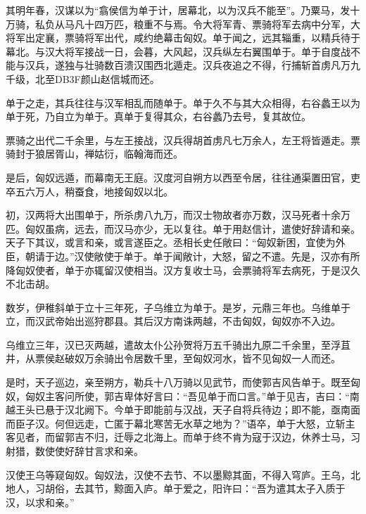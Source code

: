 \documentclass[12pt,UTF8]{ctexbook}
\begin{document}
其明年春，汉谋以为“翕侯信为单于计，居幕北，以为汉兵不能至”。乃粟马，发十万骑，私负从马凡十四万匹，粮重不与焉。令大将军青、票骑将军去病中分军，大将军出定襄，票骑将军出代，咸约绝幕击匈奴。单于闻之，远其辎重，以精兵待于幕北。与汉大将军接战一日，会暮，大风起，汉兵纵左右翼围单于。单于自度战不能与汉兵，遂独与壮骑数百溃汉围西北遁走。汉兵夜追之不得，行捕斩首虏凡万九千级，北至DB3F颜山赵信城而还。



单于之走，其兵往往与汉军相乱而随单于。单于久不与其大众相得，右谷蠡王以为单于死，乃自立为单于。真单于复得其众，右谷蠡乃去号，复其故位。



票骑之出代二千余里，与左王接战，汉兵得胡首虏凡七万余人，左王将皆遁走。票骑封于狼居胥山，禅姑衍，临翰海而还。



是后，匈奴远遁，而幕南无王庭。汉度河自朔方以西至令居，往往通渠置田官，吏卒五六万人，稍蚕食，地接匈奴以北。



初，汉两将大出围单于，所杀虏八九万，而汉士物故者亦万数，汉马死者十余万匹。匈奴虽病，远去，而汉马亦少，无以复往。单于用赵信计，遣使好辞请和亲。天子下其议，或言和亲，或言遂臣之。丞相长史任敞曰：“匈奴新困，宜使为外臣，朝请于边。”汉使敞使于单于。单于闻敞计，大怒，留之不遣。先是，汉亦有所降匈奴使者，单于亦辄留汉使相当。汉方复收士马，会票骑将军去病死，于是汉久不北击胡。



数岁，伊稚斜单于立十三年死，子乌维立为单于。是岁，元鼎三年也。乌维单于立，而汉武帝始出巡狩郡县。其后汉方南诛两越，不击匈奴，匈奴亦不入边。



乌维立三年，汉已灭两越，遣故太仆公孙贺将万五千骑出九原二千余里，至浮苴井，从票侯赵破奴万余骑出令居数千里，至匈奴河水，皆不见匈奴一人而还。



是时，天子巡边，亲至朔方，勒兵十八万骑以见武节，而使郭吉风告单于。既至匈奴，匈奴主客问所使，郭吉卑体好言曰：“吾见单于而口言。”单于见吉，吉曰：“南越王头已悬于汉北阙下。今单于即能前与汉战，天子自将兵待边；即不能，亟南面而臣子汉。何但远走，亡匿于幕北寒苦无水草之地为？”语卒，单于大怒，立斩主客见者，而留郭吉不归，迁辱之北海上。而单于终不肯为寇于汉边，休养士马，习射猎，数使使好辞甘言求和亲。



汉使王乌等窥匈奴。匈奴法，汉使不去节、不以墨黥其面，不得入穹庐。王乌，北地人，习胡俗，去其节，黥面入庐。单于爱之，阳许曰：“吾为遣其太子入质于汉，以求和亲。”
\end{document}
